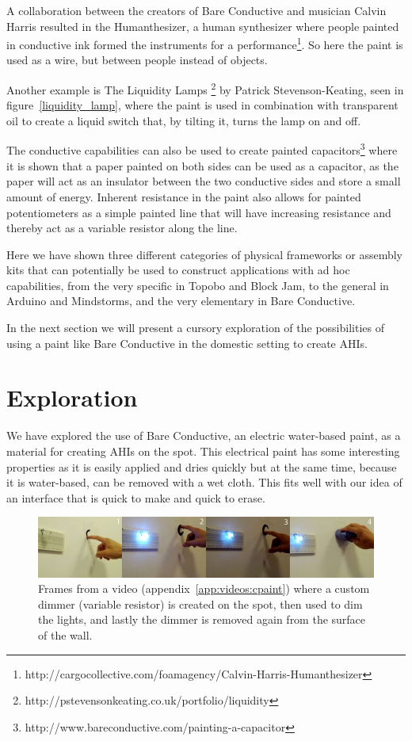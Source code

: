 A collaboration between the creators of Bare Conductive and musician Calvin Harris resulted in the Humanthesizer, a human synthesizer where people painted in conductive ink formed the instruments for a performance\footnote{http://cargocollective.com/foamagency/Calvin-Harris-Humanthesizer}.
So here the paint is used as a wire, but between people instead of objects.

Another example is The Liquidity Lamps \footnote{http://pstevensonkeating.co.uk/portfolio/liquidity} by Patrick Stevenson-Keating, seen in figure~\ref{liquidity_lamp}, where the paint is used in combination with transparent oil to create a liquid switch that, by tilting it, turns the lamp on and off.

The conductive capabilities can also be used to create painted capacitors\footnote{http://www.bareconductive.com/painting-a-capacitor} where it is shown that a paper painted on both sides can be used as a capacitor, as the paper will act as an insulator between the two conductive sides and store a small amount of energy.
Inherent resistance in the paint also allows for painted potentiometers as a simple painted line that will have increasing resistance and thereby act as a variable resistor along the line.

Here we have shown three different categories of physical frameworks or assembly kits that can potentially be used to construct applications with ad hoc capabilities, from the very specific in Topobo and Block Jam, to the general in Arduino and Mindstorms, and the very elementary in Bare Conductive.

In the next section we will present a cursory exploration of the possibilities of using a paint like Bare Conductive in the domestic setting to create AHIs.

\section{Exploration}
We have explored the use of Bare Conductive, an electric water-based paint, as a material for creating AHIs on the spot.
This electrical paint has some interesting properties as it is easily applied and dries quickly but at the same time, because it is water-based, can be removed with a wet cloth.
This fits well with our idea of an interface that is quick to make and quick to erase.

\begin{figure}[h]
  \centering
  \includegraphics[width=.9\textwidth]{figures/proto3/light-variable-res}
  \caption{Frames from a video (appendix~\ref{app:videos:cpaint}) where a custom dimmer (variable resistor) is created on the spot, then used to dim the lights, and lastly the dimmer is removed again from the surface of the wall.}
  \label{fig:ch:proto3:variable}
\end{figure}


